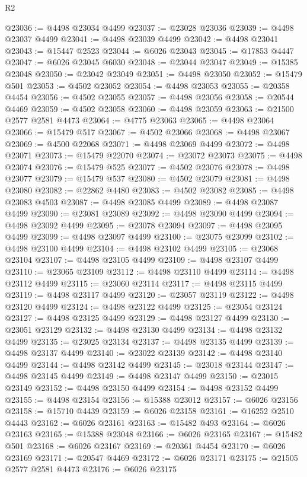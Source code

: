 \begin{lexlean}{R2}
\begin{coremodule}
@23036 := @4498 @23034 @4499
@23037 := @23028 @23036
@23039 := @4498 @23037 @4499
@23041 := @4498 @23039 @4499
@23042 := @4498 @23041
@23043 := @15447 @2523
@23044 := @6026 @23043
@23045 := @17853 @4447
@23047 := @6026 @23045 @6030
@23048 := @23044 @23047
@23049 := @15385 @23048
@23050 := @23042 @23049
@23051 := @4498 @23050
@23052 := @15479 @501
@23053 := @4502 @23052
@23054 := @4498 @23053
@23055 := @20358 @4454
@23056 := @4502 @23055
@23057 := @4498 @23056
@23058 := @20544 @4469
@23059 := @4502 @23058
@23060 := @4498 @23059
@23063 := @21500 @2577 @2581 @4473
@23064 := @4775 @23063
@23065 := @4498 @23064
@23066 := @15479 @517
@23067 := @4502 @23066
@23068 := @4498 @23067
@23069 := @4500 @22068
@23071 := @4498 @23069 @4499
@23072 := @4498 @23071
@23073 := @15479 @22070
@23074 := @23072 @23073
@23075 := @4498 @23074
@23076 := @15479 @525
@23077 := @4502 @23076
@23078 := @4498 @23077
@23079 := @15479 @537
@23080 := @4502 @23079
@23081 := @4498 @23080
@23082 := @22862 @4480
@23083 := @4502 @23082
@23085 := @4498 @23083 @4503
@23087 := @4498 @23085 @4499
@23089 := @4498 @23087 @4499
@23090 := @23081 @23089
@23092 := @4498 @23090 @4499
@23094 := @4498 @23092 @4499
@23095 := @23078 @23094
@23097 := @4498 @23095 @4499
@23099 := @4498 @23097 @4499
@23100 := @23075 @23099
@23102 := @4498 @23100 @4499
@23104 := @4498 @23102 @4499
@23105 := @23068 @23104
@23107 := @4498 @23105 @4499
@23109 := @4498 @23107 @4499
@23110 := @23065 @23109
@23112 := @4498 @23110 @4499
@23114 := @4498 @23112 @4499
@23115 := @23060 @23114
@23117 := @4498 @23115 @4499
@23119 := @4498 @23117 @4499
@23120 := @23057 @23119
@23122 := @4498 @23120 @4499
@23124 := @4498 @23122 @4499
@23125 := @23054 @23124
@23127 := @4498 @23125 @4499
@23129 := @4498 @23127 @4499
@23130 := @23051 @23129
@23132 := @4498 @23130 @4499
@23134 := @4498 @23132 @4499
@23135 := @23025 @23134
@23137 := @4498 @23135 @4499
@23139 := @4498 @23137 @4499
@23140 := @23022 @23139
@23142 := @4498 @23140 @4499
@23144 := @4498 @23142 @4499
@23145 := @23018 @23144
@23147 := @4498 @23145 @4499
@23149 := @4498 @23147 @4499
@23150 := @23015 @23149
@23152 := @4498 @23150 @4499
@23154 := @4498 @23152 @4499
@23155 := @4498 @23154
@23156 := @15388 @23012
@23157 := @6026 @23156
@23158 := @15710 @4439
@23159 := @6026 @23158
@23161 := @16252 @2510 @4443
@23162 := @6026 @23161
@23163 := @15482 @493
@23164 := @6026 @23163
@23165 := @15388 @23048
@23166 := @6026 @23165
@23167 := @15482 @501
@23168 := @6026 @23167
@23169 := @20361 @4454
@23170 := @6026 @23169
@23171 := @20547 @4469
@23172 := @6026 @23171
@23175 := @21505 @2577 @2581 @4473
@23176 := @6026 @23175

\end{coremodule}
\end{lexlean}
